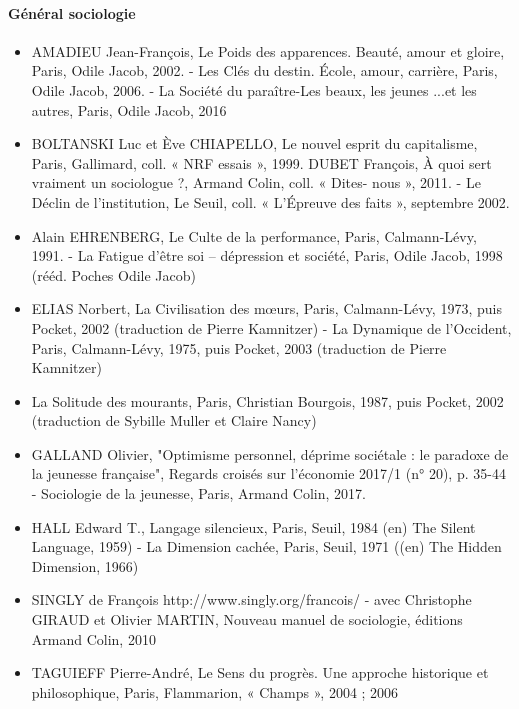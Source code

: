 \paragraph{Général sociologie}  
\begin{itemize}
\item   AMADIEU Jean-François, Le Poids des apparences. Beauté, amour et gloire, Paris, Odile Jacob, 2002. - Les Clés du destin. École, amour, carrière, Paris, Odile Jacob, 2006. - La Société du paraître-Les beaux, les jeunes ...et les autres, Paris, Odile Jacob, 2016 
\item BOLTANSKI Luc et Ève CHIAPELLO, Le nouvel esprit du capitalisme, Paris,  Gallimard, coll. « NRF essais », 1999. DUBET François, À quoi sert vraiment un sociologue ?, Armand Colin, coll. « Dites-  nous », 2011. - Le Déclin de l'institution, Le Seuil, coll. « L'Épreuve des faits », septembre 2002. 
\item Alain EHRENBERG, Le Culte de la performance, Paris, Calmann-Lévy, 1991. - La Fatigue d’être soi – dépression et société, Paris, Odile Jacob, 1998  (rééd. Poches Odile Jacob) 
\item ELIAS Norbert, La Civilisation des mœurs, Paris, Calmann-Lévy, 1973, puis Pocket, 2002 (traduction de Pierre Kamnitzer) - La Dynamique de l’Occident, Paris, Calmann-Lévy, 1975, puis Pocket, 2003 (traduction de Pierre Kamnitzer)
\item La Solitude des mourants, Paris, Christian Bourgois, 1987, puis Pocket, 2002 (traduction de Sybille Muller et Claire Nancy) 
\item GALLAND Olivier, "Optimisme personnel, déprime sociétale : le paradoxe de la jeunesse française", Regards croisés sur l’économie 2017/1 (n° 20), p. 35-44 - Sociologie de la jeunesse, Paris, Armand Colin, 2017. 
\item HALL Edward T., Langage silencieux, Paris, Seuil, 1984 (en) The Silent Language, 1959) - La Dimension cachée, Paris, Seuil, 1971 ((en) The Hidden Dimension, 1966) 
\item SINGLY de François http://www.singly.org/francois/ - avec Christophe GIRAUD et Olivier MARTIN, Nouveau manuel de sociologie, éditions Armand Colin, 2010 
\item TAGUIEFF Pierre-André,  Le Sens du progrès. Une approche historique et   philosophique, Paris, Flammarion, « Champs », 2004 ; 2006   


\end{itemize}

